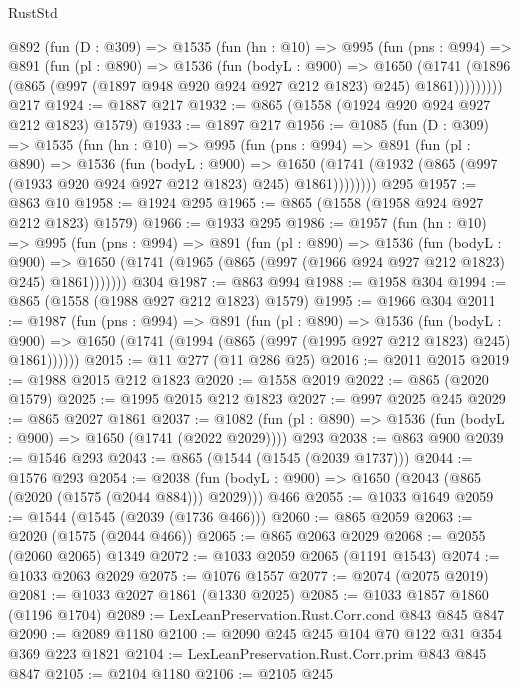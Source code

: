 \begin{lexlean}{RustStd}
\begin{coremodule}
    @892
      (fun (D : @309) =>
      @1535
        (fun (hn : @10) =>
        @995
          (fun (pns : @994) =>
          @891
            (fun (pl : @890) =>
            @1536
              (fun (bodyL : @900) =>
              @1650
                (@1741
                  (@1896 (@865 (@997 (@1897 @948 @920 @924 @927 @212 @1823) @245) @1861)))))))))
    @217
@1924 := @1887 @217
@1932 := @865 (@1558 (@1924 @920 @924 @927 @212 @1823) @1579)
@1933 := @1897 @217
@1956 := @1085
    (fun (D : @309) =>
    @1535
      (fun (hn : @10) =>
      @995
        (fun (pns : @994) =>
        @891
          (fun (pl : @890) =>
          @1536
            (fun (bodyL : @900) =>
            @1650 (@1741 (@1932 (@865 (@997 (@1933 @920 @924 @927 @212 @1823) @245) @1861))))))))
    @295
@1957 := @863 @10
@1958 := @1924 @295
@1965 := @865 (@1558 (@1958 @924 @927 @212 @1823) @1579)
@1966 := @1933 @295
@1986 := @1957
    (fun (hn : @10) =>
    @995
      (fun (pns : @994) =>
      @891
        (fun (pl : @890) =>
        @1536
          (fun (bodyL : @900) =>
          @1650 (@1741 (@1965 (@865 (@997 (@1966 @924 @927 @212 @1823) @245) @1861)))))))
    @304
@1987 := @863 @994
@1988 := @1958 @304
@1994 := @865 (@1558 (@1988 @927 @212 @1823) @1579)
@1995 := @1966 @304
@2011 := @1987
    (fun (pns : @994) =>
    @891
      (fun (pl : @890) =>
      @1536
        (fun (bodyL : @900) =>
        @1650 (@1741 (@1994 (@865 (@997 (@1995 @927 @212 @1823) @245) @1861))))))
@2015 := @11 @277 (@11 @286 @25)
@2016 := @2011 @2015
@2019 := @1988 @2015 @212 @1823
@2020 := @1558 @2019
@2022 := @865 (@2020 @1579)
@2025 := @1995 @2015 @212 @1823
@2027 := @997 @2025 @245
@2029 := @865 @2027 @1861
@2037 := @1082 (fun (pl : @890) => @1536 (fun (bodyL : @900) => @1650 (@1741 (@2022 @2029)))) @293
@2038 := @863 @900
@2039 := @1546 @293
@2043 := @865 (@1544 (@1545 (@2039 @1737)))
@2044 := @1576 @293
@2054 := @2038 (fun (bodyL : @900) => @1650 (@2043 (@865 (@2020 (@1575 (@2044 @884))) @2029))) @466
@2055 := @1033 @1649
@2059 := @1544 (@1545 (@2039 (@1736 @466)))
@2060 := @865 @2059
@2063 := @2020 (@1575 (@2044 @466))
@2065 := @865 @2063 @2029
@2068 := @2055 (@2060 @2065) @1349
@2072 := @1033 @2059 @2065 (@1191 @1543)
@2074 := @1033 @2063 @2029
@2075 := @1076 @1557
@2077 := @2074 (@2075 @2019)
@2081 := @1033 @2027 @1861 (@1330 @2025)
@2085 := @1033 @1857 @1860 (@1196 @1704)
@2089 := LexLeanPreservation.Rust.Corr.cond @843 @845 @847
@2090 := @2089 @1180
@2100 := @2090 @245 @245 @104 @70 @122 @31 @354 @369 @223 @1821
@2104 := LexLeanPreservation.Rust.Corr.prim @843 @845 @847
@2105 := @2104 @1180
@2106 := @2105 @245

\end{coremodule}
\end{lexlean}
